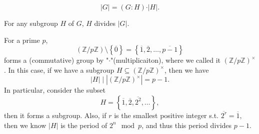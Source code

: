 \begin{theorem}
    \[
        \vert G \vert = (G:H) \cdot \vert H \vert.
    \]
\end{theorem}

\begin{corollary} \label{cl: Lagrange theorem}
    For any subgroup \(H\) of \(G\), \(H\) divides \(\vert G \vert \).
\end{corollary}

\begin{eg}
    For a prime \(p\), 
    \[
        \left( \mathbb{Z} / p \mathbb{Z}  \right) \setminus \left\{ \overline{0} \right\} = \left\{ \overline{1}, \overline{2}, \dots , \overline{p-1}   \right\}   
    \]forms a (commutative) group by "\(\cdot\)"(multiplicaiton), where we called it \(\left( \mathbb{Z} / p \mathbb{Z}  \right)^{\times } \). In this case, if we have a subgroup \(H \subseteq (\mathbb{Z} / p \mathbb{Z} )^{\times }\), then we have
    \[
        \vert H \vert \mid \left\vert \left( \mathbb{Z} / p \mathbb{Z} \right)^{\times }   \right\vert  = p - 1.  
    \] In particular, consider the subset
    \[
        H = \left\{ \overline{1}, \overline{2}, \overline{2^2}, \dots    \right\},
    \] then it forms a subgroup. Also, if \(r\) is the smallest positive integer s.t. \(\overline{2^r} = \overline{1} \), then we know \(\vert H \vert \) is the period of \(2^n \mod{p}\), and thus this period divides \(p - 1\). 
\end{eg}